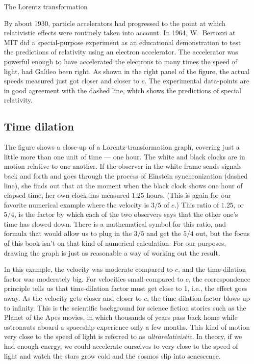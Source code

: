 \begin{section}{The Lorentz transformation}

By about 1930, particle accelerators had progressed to the point
at which relativistic effects were routinely taken into account. In
1964, W.~Bertozzi at MIT did a special-purpose experiment as an educational demonstration
to test the predictions of relativity using an electron accelerator.
The accelerator was powerful enough to have accelerated the electrons to many times
the speed of light, had Galileo been right. As shown in the right panel of the figure,
the actual speeds measured just got closer
and closer to $c$. The experimental data-points are in good agreement with the dashed line, which
shows the predictions of special relativity.

\section{Time dilation}

The figure shows a close-up of a Lorentz-transformation graph, covering just a little more
than one unit of time --- one hour. The white and black clocks are in motion relative to one
another. If the observer in the white frame sends signals back and forth and goes through the
process of Einstein synchronization (dashed line), she finds out that at the moment when the black clock shows
one hour of elapsed time, her own clock has measured $1.25$ hours. (This is again for our favorite
numerical example where the velocity is $3/5$ of $c$.) This ratio of $1.25$, or $5/4$, is the factor
by which each of the two observers says that the other one's time has slowed down. There is a mathematical
symbol for this ratio, and formula that would allow us to plug in the $3/5$ and get the $5/4$ out, but
the focus of this book isn't on that kind of numerical calculation. For our purposes, drawing the graph
is just as reasonable a way of working out the result.


In this example, the velocity was moderate compared to $c$, and the time-dilation factor was moderately big.
For velocities small compared to $c$, the correspondence principle tells us that time-dilation factor must get close to 1,
i.e., the effect goes away.
As the velocity gets closer and closer to $c$, the time-dilation factor blows up to infinity. This is the
scientific background for science fiction stories such as the Planet of the Apes movies, in which thousands of
years pass back home while astronauts aboard a spaceship experience only a few months.
This kind of motion very close to the speed of light is referred to as
\emph{ultrarelativistic}. In theory, if we had enough
energy, we could accelerate ourselves to very close to the speed of light and watch the stars grow cold and the
cosmos slip into senescence.


\end{section}

